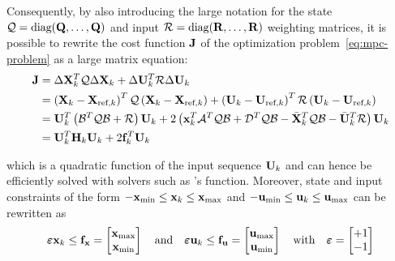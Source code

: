 \documentclass[../main.tex]{subfiles}
\begin{document}
Consequently, by also introducing the large notation for the state $\mathcal{Q} =
\text{diag}(\mathbf{Q}, \ldots, \mathbf{Q})$ and input $\mathcal{R} =
\text{diag}(\mathbf{R}, \ldots, \mathbf{R})$ weighting matrices, it is possible
to rewrite the cost function $\mathbf{J}$ of the
optimization problem~\ref{eq:mpc-problem} as a large matrix equation:
\begin{equation*}
	\begin{aligned}
		\mathbf{J} &= \Delta \mathbf{X}_k^T \mathcal{Q} \Delta \mathbf{X}_k + \Delta \mathbf{U}_k^T
	\mathcal{R} \Delta \mathbf{U}_k\\
				 & = \left( \mathbf{X}_k - \mathbf{X}_{\text{ref},k} \right)^T
				 \mathcal{Q} \left( \mathbf{X}_k - \mathbf{X}_{\text{ref},k} \right) +
				 \left( \mathbf{U}_k - \mathbf{U}_{\text{ref},k} \right)^T \mathcal{R}
				 \left( \mathbf{U}_k - \mathbf{U}_{\text{ref},k} \right)\\
				 &= \mathbf{U}_k^T \left(
						\mathcal{B}^T \mathcal{Q} \mathcal{B} + \mathcal{R}
					\right) \mathbf{U}_k 
					+ 2 \left(
						\mathbf{x}_k^T \mathcal{A}^T \mathcal{Q} \mathcal{B} 
						+ \mathcal{D}^T \mathcal{Q} \mathcal{B}
						- \bar{\mathbf{X}}_k^T \mathcal{Q} \mathcal{B}
						- \bar{\mathbf{U}}_k^T \mathcal{R}
					\right) \mathbf{U}_k\\
				 &= \mathbf{U}_k^T \mathbf{H}_k \mathbf{U}_k + 2 \mathbf{f}_k^T \mathbf{U}_k
	\end{aligned}
\end{equation*}

which is a quadratic function of the input sequence $\mathbf{U}_k$ and can hence be
efficiently solved with solvers such as 's  function.
Moreover, state and input constraints of the form $-\mathbf{x}_{\min} \leq
\mathbf{x}_k \leq \mathbf{x}_{\max}$ and $-\mathbf{u}_{\min} \leq \mathbf{u}_k \leq
\mathbf{u}_{\max}$ 
can be rewritten as
\begin{equation*}
	\boldsymbol{\varepsilon} \mathbf{x}_k \leq \mathbf{f}_{\mathbf{x}} = \begin{bmatrix}
		\mathbf{x}_{\max}\\
		\mathbf{x}_{\min}
	\end{bmatrix}
	\quad \text{and} \quad
	\boldsymbol{\varepsilon} \mathbf{u}_k \leq \mathbf{f}_{\mathbf{u}} = \begin{bmatrix}
		\mathbf{u}_{\max}\\
		\mathbf{u}_{\min}
	\end{bmatrix}
	\quad \text{with} \quad
	\boldsymbol{\varepsilon} = \begin{bmatrix}
		+1\\
		-1
	\end{bmatrix}
\end{equation*}
\end{document}
